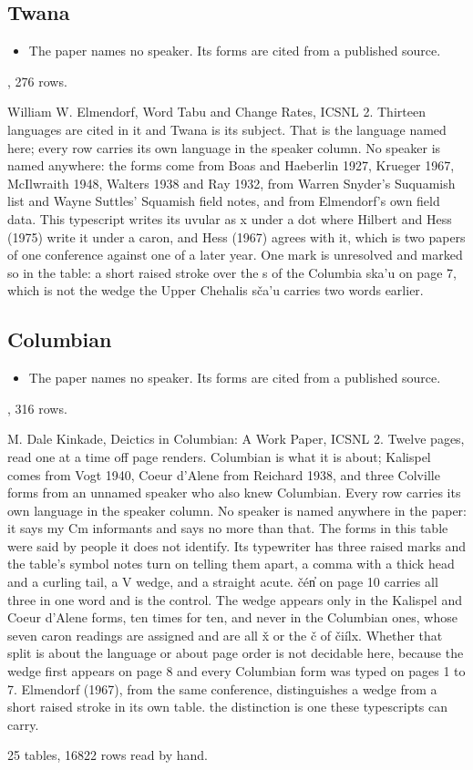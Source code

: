 \subsection{Twana}

\begin{itemize}
\item The paper names no speaker. Its forms are cited from a published source.
\end{itemize}

\cite{src:Elmendorf-1967}, 276 rows.

William W. Elmendorf, Word Tabu and Change Rates, ICSNL 2. Thirteen languages are cited in it and Twana is its subject. That is the language named here; every row carries its own language in the speaker column. No speaker is named anywhere: the forms come from Boas and Haeberlin 1927, Krueger 1967, McIlwraith 1948, Walters 1938 and Ray 1932, from Warren Snyder's Suquamish list and Wayne Suttles' Squamish field notes, and from Elmendorf's own field data. This typescript writes its uvular as x under a dot where Hilbert and Hess (1975) write it under a caron, and Hess (1967) agrees with it, which is two papers of one conference against one of a later year. One mark is unresolved and marked so in the table: a short raised stroke over the s of the Columbia ska'u on page 7, which is not the wedge the Upper Chehalis sča'u carries two words earlier.

\subsection{Columbian}

\begin{itemize}
\item The paper names no speaker. Its forms are cited from a published source.
\end{itemize}

\cite{src:Kinkade-1967}, 316 rows.

M. Dale Kinkade, Deictics in Columbian: A Work Paper, ICSNL 2. Twelve pages, read one at a time off page renders. Columbian is what it is about; Kalispel comes from Vogt 1940, Coeur d'Alene from Reichard 1938, and three Colville forms from an unnamed speaker who also knew Columbian. Every row carries its own language in the speaker column. No speaker is named anywhere in the paper: it says my Cm informants and says no more than that. The forms in this table were said by people it does not identify. Its typewriter has three raised marks and the table's symbol notes turn on telling them apart, a comma with a thick head and a curling tail, a V wedge, and a straight acute. čén̓ on page 10 carries all three in one word and is the control. The wedge appears only in the Kalispel and Coeur d'Alene forms, ten times for ten, and never in the Columbian ones, whose seven caron readings are assigned and are all x̌ or the č of čiílx. Whether that split is about the language or about page order is not decidable here, because the wedge first appears on page 8 and every Columbian form was typed on pages 1 to 7. Elmendorf (1967), from the same conference, distinguishes a wedge from a short raised stroke in its own table. the distinction is one these typescripts can carry.

25 tables, 16822 rows read by hand.

